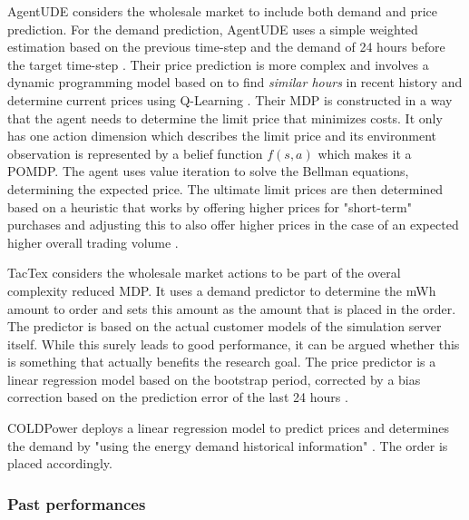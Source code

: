 AgentUDE considers the wholesale market to include both demand and price prediction. For the demand prediction, AgentUDE
uses a simple weighted estimation based on the previous time-step and the demand of 24 hours before the target time-step
\cite[]{ozdemir2015winner}. Their price prediction is more complex and involves a dynamic programming model based on
\cite[]{tesauro2002strategic} to find \emph{similar hours} in recent history and determine current prices using
Q-Learning \cite[]{ozdemir2017strategy}. Their \ac{MDP} is constructed in a way that the agent needs to determine the
limit price that minimizes costs. It only has one action dimension which describes the limit price and its environment
observation is represented by a belief function $f(s,a)$ which makes it a \ac{POMDP}. The agent uses value iteration to
solve the Bellman equations, determining the expected price. The ultimate limit prices are then determined based on a
heuristic that works by offering higher prices for "short-term" purchases and adjusting this to also offer higher prices
in the case of an expected higher overall trading volume \cite[]{ozdemir2017strategy}. 

TacTex considers the wholesale market actions to be part of the overal complexity reduced \ac{MDP}. It uses a demand
predictor to determine the \ac{mWh} amount to order and sets this amount as the amount that is placed in the order. The
predictor is based on the actual customer models of the simulation server itself. While this surely leads to good
performance, it can be argued whether this is something that actually benefits the research goal. The price predictor is
a linear regression model based on the bootstrap period, corrected by a bias correction based on the prediction error of
the last 24 hours \cite[]{tactexurieli2016mdp}.

COLDPower deploys a linear regression model to predict prices and determines the demand by "using the energy demand
historical information" \cite[]{cuevas2015distributed}. The order is placed accordingly. 


\subsubsection{Past performances}%
\label{ssub:past_performances}


